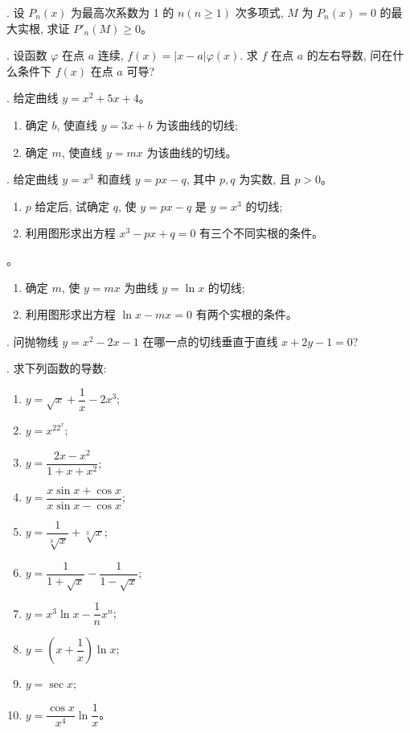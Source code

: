 \documentclass[UTF8,12pt,a4paper,fontset=fandol]{ctexart}
\begin{document}
. 设 $P_n(x)$ 为最高次系数为 1 的 $n(n\geqslant1)$ 次多项式, $M$ 为 $P_n(x)=0$ 的最大实根, 求证 $P'_n(M)\geqslant0$。

. 设函数 $\varphi$ 在点 $a$ 连续, $f(x)=|x-a|\varphi(x)$. 求 $f$ 在点 $a$ 的左右导数, 问在什么条件下 $f(x)$ 在点 $a$ 可导?

. 给定曲线 $y=x^2+5x+4$。
\begin{enumerate}
  \item 确定 $b$, 使直线 $y=3x+b$ 为该曲线的切线;
  \item 确定 $m$, 使直线 $y=mx$ 为该曲线的切线。
\end{enumerate}

. 给定曲线 $y=x^3$ 和直线 $y=px-q$, 其中 $p,q$ 为实数, 且 $p>0$。
\begin{enumerate}
  \item $p$ 给定后, 试确定 $q$, 使 $y=px-q$ 是 $y=x^3$ 的切线;
  \item 利用图形求出方程 $x^3-px+q=0$ 有三个不同实根的条件。
\end{enumerate}

。
\begin{enumerate}
  \item 确定 $m$, 使 $y=mx$ 为曲线 $y=\ln x$ 的切线;
  \item 利用图形求出方程 $\ln x-mx=0$ 有两个实根的条件。
\end{enumerate}

. 问抛物线 $y=x^2-2x-1$ 在哪一点的切线垂直于直线 $x+2y-1=0$?

. 求下列函数的导数:
\begin{enumerate}
  \item $y=\sqrt{x}+\dfrac1x-2x^3$;
  \item $y=x^22^x$;
  \item $y=\dfrac{2x-x^2}{1+x+x^2}$;
  \item $y=\dfrac{x\sin x+\cos x}{x\sin x-\cos x}$;
  \item $y=\dfrac1{\sqrt[3]{x}}+\sqrt[3]{x}$;
  \item $y=\dfrac1{1+\sqrt{x}}-\dfrac1{1-\sqrt{x}}$;
  \item $y=x^3\ln x-\dfrac1n x^n$;
  \item $y=\left(x+\dfrac1x\right)\ln x$;
  \item $y=\sec x$;
  \item $y=\dfrac{\cos x}{x^4}\ln\dfrac1x$。
\end{enumerate}
\end{document}
